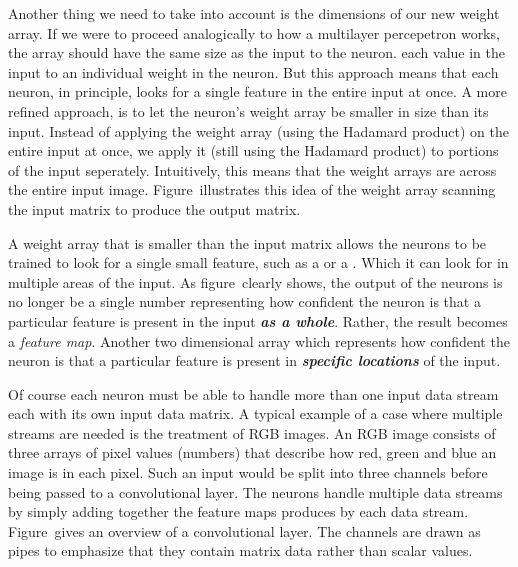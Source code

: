 Another thing we need to take into account is the dimensions of our new weight array.
If we were to proceed analogically to how a multilayer percepetron works, the array should have the same size as the input to the neuron.
 each value in the input to an individual weight in the neuron.
But this approach means that each neuron, in principle, looks for a single feature in the entire input at once.
A more refined approach, is to let the neuron's weight array be smaller in size than its input.
Instead of applying the weight array (using the Hadamard product) on the entire input at once, we apply it (still using the Hadamard product) to portions of the input seperately.
Intuitively, this means that the weight arrays are  across the entire input image.
Figure~ illustrates this idea of the weight array scanning the input matrix to produce the output matrix.

A weight array that is smaller than the input matrix allows the neurons to be trained to look for a single small feature, such as a  or a .
Which it can look for in multiple areas of the input.
As figure~ clearly shows, the output of the neurons is no longer be a single number representing how  confident the neuron is that a particular feature is present in the input {\em\bf as a whole}.
Rather, the result becomes a {\em feature map}.
Another two dimensional array which represents how  confident the neuron is that a particular feature is present in {\em\bf specific locations} of the input.

\startplacefigure[
    reference=conv-operation,
    title={The basic forward operation of a convolutional layer~\cite[escontrela_2018].},
    location=bottom,
]
{}{}
{}{}
{}{}
{}{}
{}{}
{}{}
{}{}
{}{}
\stopcombination
\stopplacefigure

Of course each neuron must be able to handle more than one input data stream each with its own input data matrix.
A typical example of a case where multiple streams are needed is the treatment of RGB images.
An RGB image consists of three arrays of pixel values (numbers) that describe how red, green and blue an image is in each pixel.
Such an input would be split into three channels before being passed to a convolutional layer.
The neurons handle multiple data streams by simply adding together the feature maps produces by each data stream.
Figure~\in[cv-network] gives an overview of a convolutional layer.
The channels are drawn as pipes to emphasize that they contain matrix data rather than scalar values.

